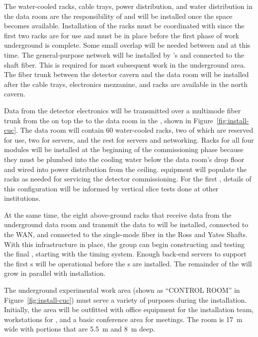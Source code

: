 The water-cooled racks, cable trays, power distribution, and water distribution in the data room are the responsibility of  and will be installed once the space becomes available.  
Installation of the racks must be coordinated with  
since the first two racks are for  use and must be in place before the first phase of work underground is complete. 
Some small overlap will be needed between  and  at this time. The general-purpose network will be installed by 's  and connected to the shaft fiber. 
This is required for most subsequent work in the underground area.
The  fiber trunk between the detector cavern and the  data room will be installed after the cable trays, electronics mezzanine, and racks are available in the north cavern.


Data from the detector electronics will be transmitted over a multimode fiber trunk from the  on top the  to the  data room in the , shown in Figure~\ref{fig:install-cuc}.  The data room will contain 60 water-cooled racks, two of which are reserved for  use, two for  servers, and the rest for  servers and networking. Racks for all four modules will be installed at the beginning of the  commissioning phase because they must be plumbed into the cooling water below the data room's drop floor and wired into power distribution from the ceiling.   equipment will populate the racks as needed for servicing the detector commissioning.  For the first , details of this configuration will be informed by  vertical slice tests done at other institutions.  

At the same time, the eight above-ground  racks that receive data from the underground data room and  transmit the data to  will %
be installed, connected to the WAN, and connected to the single-mode fiber in the Ross and Yates Shafts.  With this infrastructure in place, the  group can begin constructing and testing the final  , starting with the %
timing system. %
Enough  back-end servers to support the first s will be operational before the s are installed.  The remainder of the  will grow in parallel with  installation.

The underground experimental work area (shown as ``CONTROL ROOM'' in Figure~\ref{fig:install-cuc}) must serve a variety of purposes during the  installation. Initially, the area will be outfitted with office equipment for the installation team, workstations for , and a basic conference area for meetings. The room is \SI{17}{m} wide with portions that are \SI{5.5}{m} and \SI{8}{m} deep.


